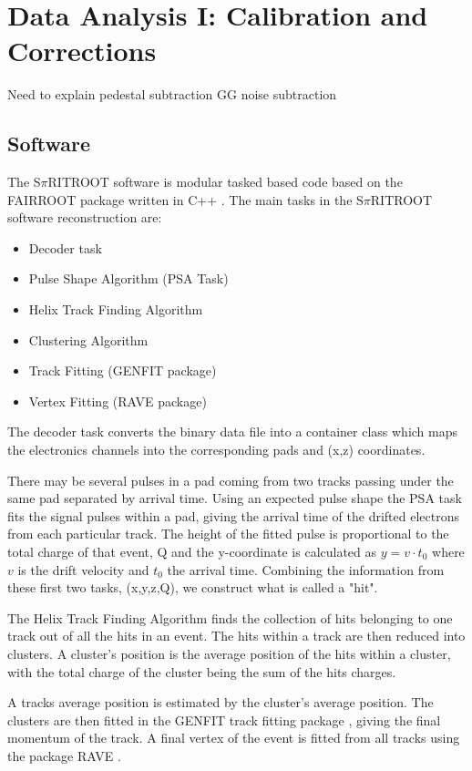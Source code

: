 \chapter{Data Analysis I: Calibration and Corrections}

Need to explain pedestal subtraction 
GG noise subtraction 

\section{Software}

The S$\pi$RITROOT software is modular tasked based code based on the FAIRROOT package written in C++ \cite{fairroot}. The main tasks in the S$\pi$RITROOT software reconstruction are:
\begin{itemize}
  \item Decoder task
  \item Pulse Shape Algorithm (PSA Task)
  \item Helix Track Finding Algorithm
  \item Clustering Algorithm
  \item Track Fitting (GENFIT package)
  \item Vertex Fitting (RAVE package)
\end{itemize}

The decoder task converts the binary data file into a container class which maps the electronics channels into the corresponding pads and (x,z) coordinates. 

There may be several pulses in a pad coming from two tracks passing under the same pad separated  by arrival time. Using an expected pulse shape the PSA task fits the signal pulses within a pad, giving the arrival time of the drifted electrons from each particular track. The height of the fitted pulse is proportional to the total charge of that event, Q and the y-coordinate is calculated as $y = v\cdot t_0$ where $v$ is the drift velocity and $t_0$ the arrival time. Combining the information from these first two tasks, (x,y,z,Q), we construct what is called a "hit". 

 The Helix Track Finding Algorithm finds the collection of hits belonging to one track out of all the hits in an event. The hits within a track are then reduced into clusters. A cluster's position is the average position of the hits within a cluster, with the total charge of the cluster being the sum of the hits charges. 
 
 A tracks average position is estimated by the cluster's average position. The clusters are then fitted in the GENFIT track fitting package \cite{genfit}, giving the final momentum of the track. A final vertex of the event is fitted from all tracks using the package RAVE \cite{rave}. 

